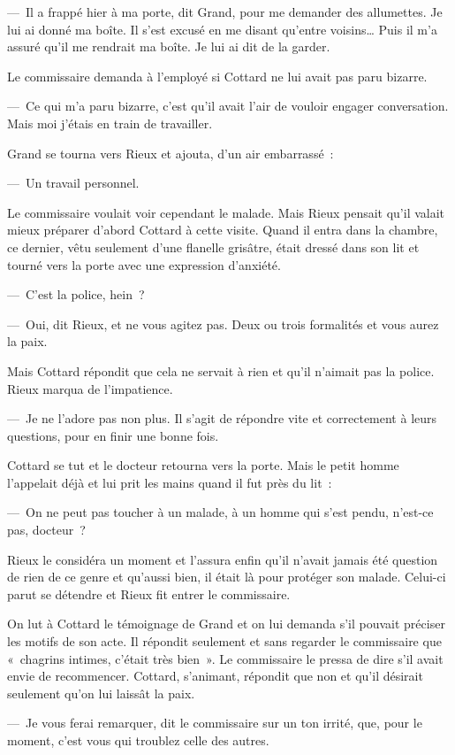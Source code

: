 \documentclass[french,twoside]{book} %
\begin{document}
— Il a frappé hier à ma porte, dit Grand, pour me demander des allumettes. Je lui ai donné ma boîte. Il s’est excusé en me disant qu’entre voisins… Puis il m’a assuré qu’il me rendrait ma boîte. Je lui ai dit de la garder.\par
Le commissaire demanda à l’employé si Cottard ne lui avait pas paru bizarre.\par
— Ce qui m’a paru bizarre, c’est qu’il avait l’air de vouloir engager conversation. Mais moi j’étais en train de travailler.\par
Grand se tourna vers Rieux et ajouta, d’un air embarrassé :\par
— Un travail personnel.\par
Le commissaire voulait voir cependant le malade. Mais Rieux pensait qu’il valait mieux préparer d’abord Cottard à cette visite. Quand il entra dans la chambre, ce dernier, vêtu seulement d’une flanelle grisâtre, était dressé dans son lit et tourné vers la porte avec une expression d’anxiété.\par
— C’est la police, hein ?\par
— Oui, dit Rieux, et ne vous agitez pas. Deux ou trois formalités et vous aurez la paix.\par
Mais Cottard répondit que cela ne servait à rien et qu’il n’aimait pas la police. Rieux marqua de l’impatience.\par
— Je ne l’adore pas non plus. Il s’agit de répondre vite et correctement à leurs questions, pour en finir une bonne fois.\par
Cottard se tut et le docteur retourna vers la porte. Mais le petit homme l’appelait déjà et lui prit les mains quand il fut près du lit :\par
— On ne peut pas toucher à un malade, à un homme qui s’est pendu, n’est-ce pas, docteur ?\par
Rieux le considéra un moment et l’assura enfin qu’il n’avait jamais été question de rien de ce genre et qu’aussi bien, il était là pour protéger son malade. Celui-ci parut se détendre et Rieux fit entrer le commissaire.\par
On lut à Cottard le témoignage de Grand et on lui demanda s’il pouvait préciser les motifs de son acte. Il répondit seulement et sans regarder le commissaire que « chagrins intimes, c’était très bien ». Le commissaire le pressa de dire s’il avait envie de recommencer. Cottard, s’animant, répondit que non et qu’il désirait seulement qu’on lui laissât la paix.\par
— Je vous ferai remarquer, dit le commissaire sur un ton irrité, que, pour le moment, c’est vous qui troublez celle des autres.\par
\end{document}
